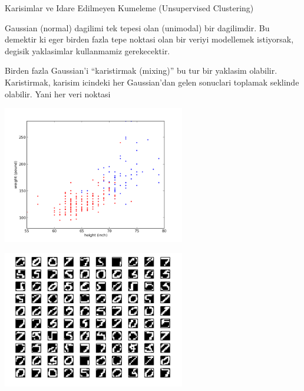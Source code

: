 \documentclass[12pt,fleqn]{article}\usepackage{../common}
\begin{document}
Karisimlar ve Idare Edilmeyen Kumeleme (Unsupervised Clustering)

Gaussian (normal) dagilimi tek tepesi olan (unimodal) bir dagilimdir. Bu
demektir ki eger birden fazla tepe noktasi olan bir veriyi modellemek
istiyorsak, degisik yaklasimlar kullanmamiz gerekecektir. 

Birden fazla Gaussian'i ``karistirmak (mixing)'' bu tur bir yaklasim
olabilir. Karistirmak, karisim icindeki her Gaussian'dan gelen sonuclari
toplamak seklinde olabilir. Yani her veri noktasi 

\includegraphics[height=6cm]{plotbio.png}


\includegraphics[height=6cm]{digits.png}
\end{document}
